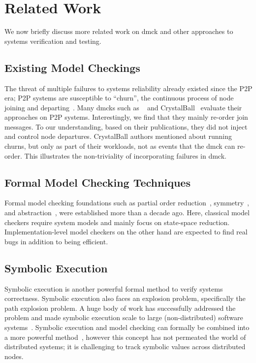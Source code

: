 
\chapter{Related Work}
\label{sec-related}


We now briefly discuss more related work on dmck and other approaches
to systems verification and testing.
\fi

\section{Existing Model Checkings}
The threat of multiple failures to systems reliability already existed
since the P2P era; P2P systems are susceptible to ``churn'', the
continuous process of node joining and departing~\cite{Rhea+04-Churn}.
Many dmcks such as \macemc~\cite{Killian+07-LifeDeathMaceMC} and
CrystalBall~\cite{Yabandeh+09-CrystalBall} evaluate their approaches
on P2P systems.  Interestingly, we find that they mainly re-order join
messages.  To our understanding, based on their publications, they did
not inject and control node departures.  CrystalBall authors mentioned
about running churns, but only as part of their workloads, not as
events that the dmck can re-order.  This illustrates the non-triviality of
incorporating failures in dmck.

\section{Formal Model Checking Techniques}
Formal model checking foundations such as partial order
reduction~\cite{Flanagan+05-Dpor, Godefroid+96-Dpor},
symmetry~\cite{Clarke+98-SymReduct, Prasad+00-SymBasedMc}, and
abstraction~\cite{Clarke+94-McAbstract}, were established more than a
decade ago.  Here, classical model checkers require system models and
mainly focus on state-space reduction.  Implementation-level model
checkers on the other hand are expected to find real bugs in addition to
being efficient.

\section{Symbolic Execution}
Symbolic execution is another powerful formal method to verify
systems correctness.  Symbolic execution also faces an explosion
problem, specifically the path explosion problem.  A huge body of work
has successfully addressed the problem and made symbolic execution
scale to large (non-distributed) software
systems~\cite{Bucur+11-ParallelSymEx, Cadar+08-KLEE, Chipounov+11-S2e,
  Cui+13-RuleDirectedSymExec, Zamfir+10-Synthesis}.  Symbolic
execution and model checking can formally be combined into a more
powerful method~\cite{Burch+92-SymbolicMC}, however this concept has
not permeated the world of distributed systems; it is challenging to
track symbolic values across distributed nodes.


